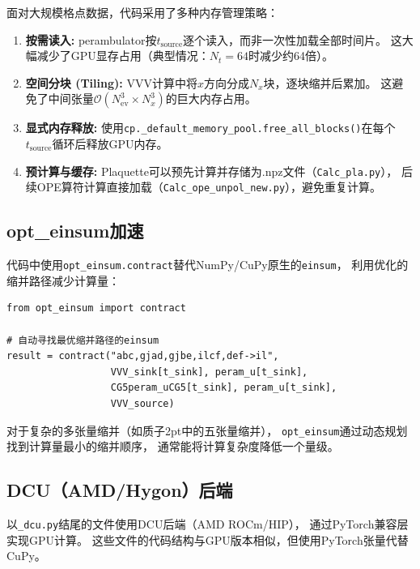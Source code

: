 \documentclass[12pt,a4paper]{ctexart}
\begin{document}
面对大规模格点数据，代码采用了多种内存管理策略：

\begin{enumerate}[label=(\arabic*), leftmargin=*]
    \item \textbf{按需读入:} perambulator按$t_{\text{source}}$逐个读入，而非一次性加载全部时间片。
    这大幅减少了GPU显存占用（典型情况：$N_t=64$时减少约64倍）。

    \item \textbf{空间分块 (Tiling):} VVV计算中将$x$方向分成$N_x$块，逐块缩并后累加。
    这避免了中间张量$\mathcal{O}(N_{\text{ev}}^3 \times N_x^3)$的巨大内存占用。

    \item \textbf{显式内存释放:} 使用\texttt{cp.\_default\_memory\_pool.free\_all\_blocks()}在每个$t_{\text{source}}$循环后释放GPU内存。

    \item \textbf{预计算与缓存:} Plaquette可以预先计算并存储为.npz文件（\texttt{Calc\_pla.py}），
    后续OPE算符计算直接加载（\texttt{Calc\_ope\_unpol\_new.py}），避免重复计算。
\end{enumerate}

\subsection{opt\_einsum加速}

代码中使用\texttt{opt\_einsum.contract}替代NumPy/CuPy原生的\texttt{einsum}，
利用优化的缩并路径减少计算量：

\begin{codebox}
\begin{lstlisting}[style=pythonstyle]
from opt_einsum import contract

# 自动寻找最优缩并路径的einsum
result = contract("abc,gjad,gjbe,ilcf,def->il",
                  VVV_sink[t_sink], peram_u[t_sink],
                  CG5peram_uCG5[t_sink], peram_u[t_sink],
                  VVV_source)
\end{lstlisting}
\end{codebox}

对于复杂的多张量缩并（如质子2pt中的五张量缩并），
\texttt{opt\_einsum}通过动态规划找到计算量最小的缩并顺序，
通常能将计算复杂度降低一个量级。

\subsection{DCU（AMD/Hygon）后端}

以\texttt{\_dcu.py}结尾的文件使用DCU后端（AMD ROCm/HIP），
通过PyTorch兼容层实现GPU计算。
这些文件的代码结构与GPU版本相似，但使用PyTorch张量代替CuPy。
\end{document}
